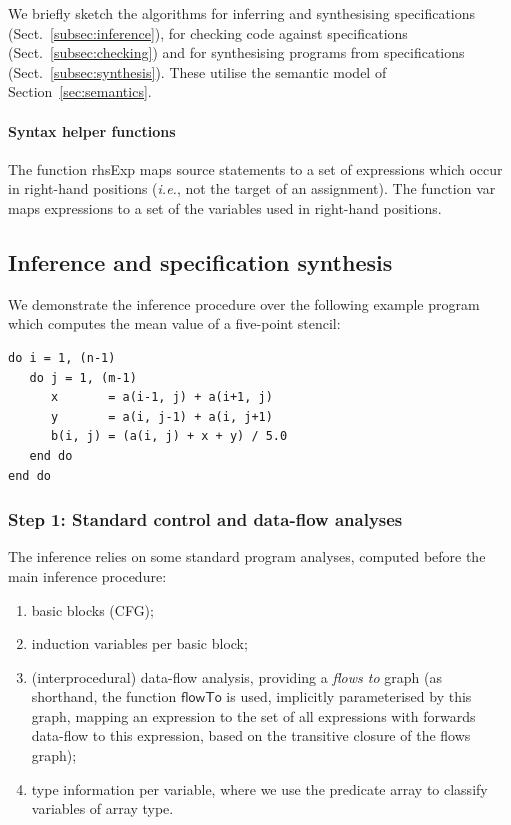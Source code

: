 \documentclass[9pt]{sigplanconf}
\newcounter{block}
\theoremstyle{definition}
\newcommand{\ie}{\emph{i.e.}}
\newcommand{\arrayTy}{\textsf{array}}
\newcommand{\rhsExp}{\textsf{rhsExp}}
\newcommand{\var}{\textsf{var}}
\begin{document}
\noindent
We briefly sketch the algorithms for inferring and synthesising
specifications (Sect.~\ref{subsec:inference}), for checking code
against specifications (Sect.~\ref{subsec:checking}) and for
synthesising programs from specifications
(Sect.~\ref{subsec:synthesis}).  These utilise the semantic model of
Section~\ref{sec:semantics}.

\paragraph{Syntax helper functions}
The function \rhsExp{} maps source statements to a
set of expressions which occur in right-hand positions (\ie{}, not the
target of an assignment). The function \var{} maps expressions to a
set of the variables used in right-hand positions.

\subsection{Inference and specification synthesis\label{subsec:inference}}

We demonstrate the inference procedure over the
following example program which computes the mean value
of a five-point stencil:%
\begin{verbatim}
do i = 1, (n-1)
   do j = 1, (m-1)
      x       = a(i-1, j) + a(i+1, j)
      y       = a(i, j-1) + a(i, j+1)
      b(i, j) = (a(i, j) + x + y) / 5.0
   end do
end do
\end{verbatim}
\subsubsection{Step 1: Standard control and data-flow analyses}
\label{sec:inf-step1}

The inference relies on some standard program analyses, computed
before the main inference procedure:
%
\begin{enumerate}
\item basic blocks (CFG);
\item induction variables per basic block;
\item (interprocedural) data-flow analysis, providing a \emph{flows to}
  graph (as shorthand, the function
  $\mathsf{flowTo}$ is used, implicitly parameterised by this graph,
  mapping an expression to the set of all expressions
  with forwards data-flow to this expression, based on the transitive
  closure of the flows graph);
\item type information per variable, where we use the predicate
\arrayTy{} to classify variables of array type.
\end{enumerate}
%
\end{document}
